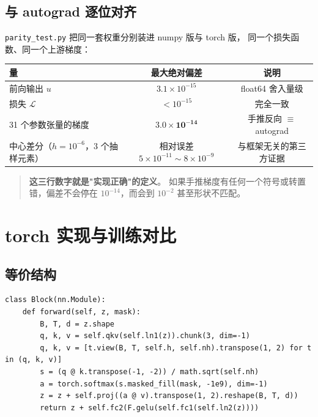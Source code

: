 \documentclass[11pt,a4paper]{ctexart}
\begin{document}
\subsection{与 autograd 逐位对齐}

\texttt{parity\_test.py} 把同一套权重分别装进 numpy 版与 torch 版，
同一个损失函数、同一个上游梯度：

\begin{center}
\small
\begin{tabular}{@{}lcc@{}}
\toprule
量 & 最大绝对偏差 & 说明 \\
\midrule
前向输出 $u$ & $3.1\times10^{-15}$ & float64 舍入量级 \\
损失 $\mathcal{L}$ & $<10^{-15}$ & 完全一致 \\
31 个参数张量的梯度 & $\mathbf{3.0\times10^{-14}}$ & 手推反向 $\equiv$ autograd \\
\midrule
中心差分（$h=10^{-6}$，3 个抽样元素） & 相对误差 $5\times10^{-11}\sim8\times10^{-9}$ & 与框架无关的第三方证据 \\
\bottomrule
\end{tabular}
\end{center}

\begin{quote}
\textbf{这三行数字就是"实现正确"的定义}。
如果手推梯度有任何一个符号或转置错，偏差不会停在 $10^{-14}$，而会到 $10^{-2}$ 甚至形状不匹配。
\end{quote}

\section{torch 实现与训练对比}

\subsection{等价结构}

\begin{lstlisting}[caption={tinytf\_torch.py 的核心（与 numpy 版一一对应）}]
class Block(nn.Module):
    def forward(self, z, mask):
        B, T, d = z.shape
        q, k, v = self.qkv(self.ln1(z)).chunk(3, dim=-1)
        q, k, v = [t.view(B, T, self.h, self.nh).transpose(1, 2) for t in (q, k, v)]
        s = (q @ k.transpose(-1, -2)) / math.sqrt(self.nh)
        a = torch.softmax(s.masked_fill(mask, -1e9), dim=-1)
        z = z + self.proj((a @ v).transpose(1, 2).reshape(B, T, d))
        return z + self.fc2(F.gelu(self.fc1(self.ln2(z))))
\end{lstlisting}
\end{document}
